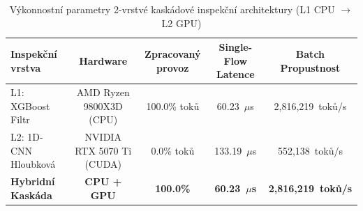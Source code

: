 \begin{table}[htbp]
\centering
\caption{Výkonnostní parametry 2-vrstvé kaskádové inspekční architektury (L1 CPU $\rightarrow$ L2 GPU)}
\label{tab:cascaded_pipeline}
\begin{tabular}{lcccc}
\hline
\textbf{Inspekční vrstva} & \textbf{Hardware} & \textbf{Zpracovaný provoz} & \textbf{Single-Flow Latence} & \textbf{Batch Propustnost} \\
\hline
L1: XGBoost Filtr & AMD Ryzen 9800X3D (CPU) & 100.0\% toků & 60.23~$\mu$s & 2,816,219~toků/s \\
L2: 1D-CNN Hloubková & NVIDIA RTX 5070 Ti (CUDA) & 0.0\% toků & 133.19~$\mu$s & 552,138~toků/s \\
\hline
\textbf{Hybridní Kaskáda} & \textbf{CPU + GPU} & \textbf{100.0\%} & \textbf{60.23~$\mu$s} & \textbf{2,816,219~toků/s} \\
\hline
\end{tabular}
\end{table}
